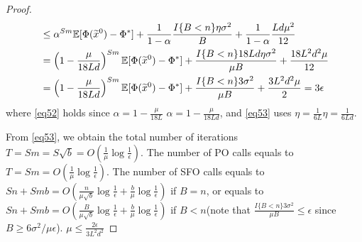 \documentclass{article}
\newcommand*{\E}{\mathbb{E}}
\theoremstyle{definition}
\theoremstyle{remark}
\begin{document}
\begin{proof}
{\begin{align}
& \leq {\alpha}^{Sm} \E[\Phi(\widetilde{x}^0) - {\Phi}^*] + \frac{1}{1-{\alpha}}\frac{I\{B < n\}\eta \sigma ^2}{B}+ \frac{1}{1-{\alpha}}\frac{L d \mu^2}{12}\notag\\
& = \left(1-\frac{\mu}{18Ld}\right)^{Sm} \E[\Phi(\widetilde{x}^0) - {\Phi}^*] + \frac{I\{B < n\}18Ld\eta \sigma ^2}{\mu B}+ \frac{18 L^2 d^2 \mu}{12}\label{eq52}\\
& = \left(1-\frac{\mu}{18Ld}\right)^{Sm} \E[\Phi(\widetilde{x}^0) - {\Phi}^*] + \frac{I\{B < n\}3 \sigma ^2}{\mu B} + \frac{3 L^2 d^2 \mu}{2}= 3 \epsilon\label{eq53}
\end{align}
}
where \eqref{eq52} holds since $\alpha = 1-\frac{\mu}{18L}$ {\color{blue}$\alpha = 1-\frac{\mu}{18Ld}$}, and \eqref{eq53} uses $\eta = \frac{1}{6L}${\color{blue}$\eta = \frac{1}{6Ld}$}.

From \eqref{eq53}, we obtain the total number of iterations $T = Sm = S\sqrt{b} = O(\frac{1}{\mu}\log\frac{1}{\epsilon})$. The number of PO calls equals to $T = Sm = O(\frac{1}{\mu}\log\frac{1}{\epsilon})$. The number of SFO calls equals to $Sn+Smb = O(\frac{n}{\mu \sqrt{b}}\log\frac{1}{\epsilon}+\frac{b}{\mu}\log\frac{1}{\epsilon})$ if $B = n$, or equals to  $Sn+Smb = O(\frac{B}{\mu \sqrt{b}}\log\frac{1}{\epsilon}+\frac{b}{\mu}\log\frac{1}{\epsilon})$ if $B < n$(note that $\frac{I\{B < n\}3 \sigma ^2}{\mu B} \leq \epsilon$ since $B \geq 6 {\sigma ^2}/{\mu \epsilon}$).
{\color{blue} $\mu \leq \frac{2\epsilon}{3 L^2 d^2}$}
\end{proof}
\end{document}
